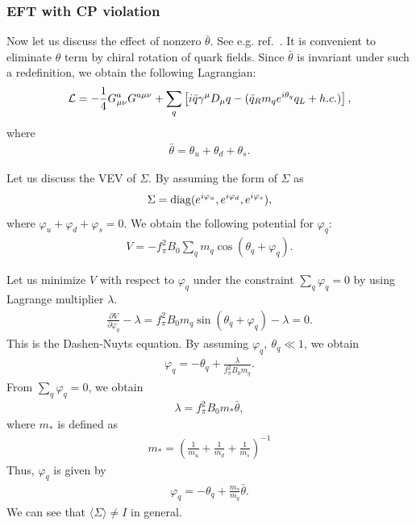 \documentclass[11pt,a4paper]{article}
\begin{document}
\subsubsection{EFT with CP violation}
Now let us discuss the effect of nonzero $\bar\theta$. See e.g. ref.~\cite{Crewther:1979pi,Pich:1991fq}.
It is convenient to eliminate $\theta$ term by chiral rotation of quark fields.
Since $\bar\theta$ is invariant under such a redefinition, we obtain the following Lagrangian:
\begin{align}
    {\cal L} =  - \frac{1}{4} G_{\mu\nu}^a G^{a\mu\nu} + \sum_q \left[ i \bar q \gamma^\mu D_\mu q - ( \bar q_R m_q e^{i\theta_q} q_L + h.c.) \right],
\end{align}
where
\begin{align}
    \bar\theta = \theta_u + \theta_d + \theta_s.
\end{align}

Let us discuss the VEV of $\Sigma$. By assuming the form of $\Sigma$ as
\begin{align}
    \Sigma = {\rm diag}(e^{i\varphi_u}, e^{i\varphi_d}, e^{i\varphi_s}),
\end{align}
where $\varphi_u + \varphi_d + \varphi_s = 0$.
We obtain the following potential for $\varphi_q$:
\begin{align}
    V = -f_\pi^2 B_0 \sum_q m_q \cos(\theta_q + \varphi_q).
\end{align}

Let us minimize $V$ with respect to $\varphi_q$ under the constraint $\sum_q \varphi_q = 0$ by using Lagrange multiplier $\lambda$.
\cite{Dashen:1970et,Nuyts:1971az}
\begin{align}
    \frac{\partial V}{\partial \varphi_q} - \lambda
    = f_\pi^2 B_0 m_q \sin(\theta_q + \varphi_q) - \lambda = 0.
\end{align}
This is the Dashen-Nuyts equation.
By assuming $\varphi_q,~\theta_q \ll 1$, we obtain
\begin{align}
    \varphi_q = -\theta_q + \frac{\lambda}{f_\pi^2 B_0 m_q}.
\end{align}
From $\sum_q \varphi_q = 0$, we obtain
\begin{align}
    \lambda = f_\pi^2 B_0 m_* \bar\theta,
\end{align}
where $m_*$ is defined as
\begin{align}
    m_* = \left( \frac{1}{m_u} + \frac{1}{m_d} + \frac{1}{m_s} \right)^{-1}
\end{align}
Thus, $\varphi_q$ is given by
\begin{align}
    \varphi_q = -\theta_q + \frac{m_*}{m_q} \bar\theta.
\end{align}
We can see that $\langle \Sigma \rangle \neq I$ in general.
\end{document}
